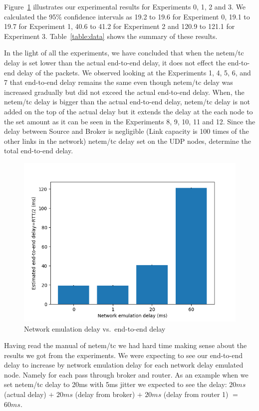 \documentclass[conference]{IEEEtran}
\begin{document}
Figure~\ref{fig:graph} illustrates our experimental results for Experiments 0, 1, 2 and 3.
We calculated the 95\% confidence intervals as 19.2 to 19.6 for Experiment 0,
19.1 to 19.7 for Experiment 1, 40.6 to 41.2 for Experiment 2 and 120.9 to 121.1
for Experiment 3. Table~\ref{table:data} shows the summary of these results.

In the light of all the experiments, we have concluded that when the netem/tc delay is set lower than the actual end-to-end delay, it does not effect the end-to-end delay of the packets. We observed looking at the Experiments 1, 4, 5, 6, and 7 that end-to-end delay remains the same even though netem/tc delay was increased gradually but did not exceed the actual end-to-end delay. When, the netem/tc delay is bigger than the actual end-to-end delay, netem/tc delay is not added on the top of the actual delay but it extends the delay at the each node to the set amount as it can be seen in the Experiments 8, 9, 10, 11 and 12. Since the delay between Source and Broker is negligible (Link capacity is 100 times of the other links in the network) netem/tc delay set on the UDP nodes, determine the total end-to-end delay.

\begin{figure}
    \centering
    \includegraphics[scale=0.6]{graphics/plt}
    \caption{Network emulation delay vs.\ end-to-end delay}\label{fig:graph}
\end{figure}

Having read the manual of netem/tc we had hard time making sense about the results we got from the experiments. We were expecting to see our end-to-end delay to increase by network emulation delay for each network delay emulated node. Namely for each pass through broker and router. As an example when we set netem/tc delay to 20ms with 5ms jitter we expected to see the delay: $20ms$ (actual delay) $+$ $20ms$ (delay from broker) $+$ $20ms$ (delay from router 1) $=$ $60ms$.
\end{document}
